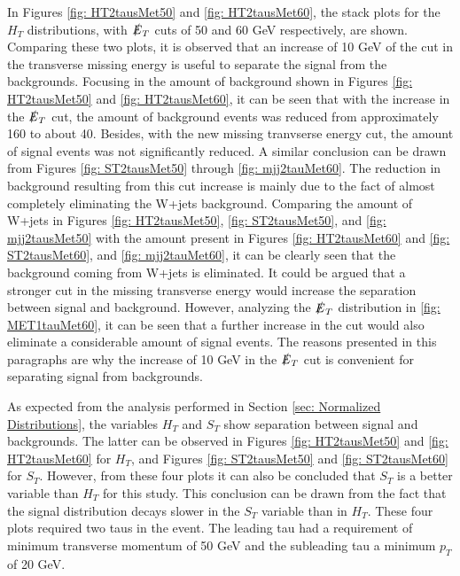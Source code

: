 In Figures \ref{fig: HT2tausMet50} and \ref{fig: HT2tausMet60}, the stack plots for the $H_{T}$ distributions, with $\slashed{E}_{T}$ cuts of 50 and 60 GeV respectively, are shown. Comparing these two plots, it is observed that an increase of 10 GeV of the cut in the transverse missing energy is useful to separate the signal from the backgrounds. Focusing in the amount of background shown in Figures \ref{fig: HT2tausMet50} and \ref{fig: HT2tausMet60}, it can be seen that with the increase in the $\slashed{E}_{T}$ cut, the amount of background events was reduced from approximately 160 to about 40. Besides, with the new missing tranvserse energy cut, the amount of signal events was not significantly reduced. A similar conclusion can be drawn from Figures \ref{fig: ST2tausMet50} through \ref{fig: mjj2tauMet60}. The reduction in background resulting from this cut increase is mainly due to the fact of almost completely eliminating the W+jets background. Comparing the amount of W+jets in Figures \ref{fig: HT2tausMet50}, \ref{fig: ST2tausMet50}, and \ref{fig: mjj2tausMet50} with the amount present in Figures \ref{fig: HT2tausMet60} and \ref{fig: ST2tausMet60}, and \ref{fig: mjj2tauMet60}, it can be clearly seen that the background coming from W+jets is eliminated. It could be argued that a stronger cut in the missing transverse energy would increase the separation between signal and background. However, analyzing the $\slashed{E}_{T}$ distribution in \ref{fig: MET1tauMet60}, it can be seen that a further increase in the cut would also eliminate a considerable amount of signal events. The reasons presented in this paragraphs are why the increase of 10 GeV in the $\slashed{E}_{T}$ cut is convenient for separating signal from backgrounds.

As expected from the analysis performed in Section \ref{sec: Normalized Distributions}, the variables $H_{T}$ and $S_{T}$ show separation between signal and backgrounds. The latter can be observed in Figures \ref{fig: HT2tausMet50} and \ref{fig: HT2tausMet60} for $H_{T}$, and Figures \ref{fig: ST2tausMet50} and \ref{fig: ST2tausMet60} for $S_{T}$. However, from these four plots it can also be concluded that $S_{T}$ is a better variable than $H_{T}$ for this study. This conclusion can be drawn from the fact that the signal distribution decays slower in the $S_{T}$ variable than in $H_{T}$. These four plots required two taus in the event. The leading tau had a requirement of minimum transverse momentum of 50 GeV and the subleading tau a minimum $p_{T}$ of 20 GeV.



